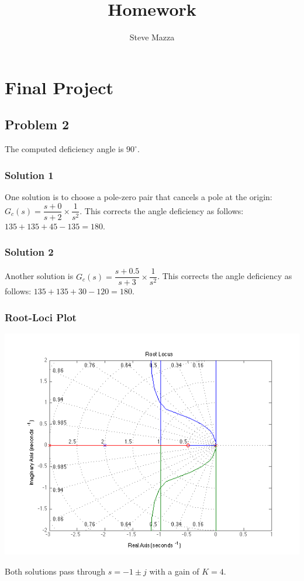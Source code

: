 \documentclass[letterpaper,10pt]{article}
\title{Homework}
\author{Steve Mazza}
\begin{document}
\maketitle

\section*{Final Project}
\subsection*{Problem 2}
The computed deficiency angle is $90^{\circ}$. 
\subsubsection*{Solution 1}
 One solution is to choose a pole-zero pair that cancels a pole at the origin: $G_{c}(s) = \dfrac{s+0}{s+2}\times\dfrac{1}{s^{2}}$.
This corrects the angle deficiency as follows: $135 + 135 + 45 - 135 = 180$.

\subsubsection*{Solution 2}
Another solution is $G_{c}(s) = \dfrac{s+0.5}{s+3}\times\dfrac{1}{s^{2}}$.
This corrects the angle deficiency as follows: $135+135+30-120=180$.

\subsubsection*{Root-Loci Plot}
\begin{center}
	\includegraphics[scale=0.75]{2-rlocus.png}
\end{center}
Both solutions pass through $s=-1\pm j$ with a gain of $K=4$.
\end{document}
